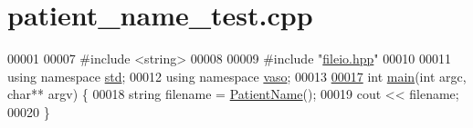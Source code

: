 \hypertarget{patient__name__test_8cpp_source}{\section{patient\+\_\+name\+\_\+test.\+cpp}
\label{patient__name__test_8cpp_source}
}

\begin{DoxyCode}
00001 
00007 \textcolor{preprocessor}{#include <string>}
00008 
00009 \textcolor{preprocessor}{#include "\hyperlink{fileio_8hpp}{fileio.hpp}"}
00010 
00011 \textcolor{keyword}{using namespace }\hyperlink{namespacestd}{std};
00012 \textcolor{keyword}{using namespace }\hyperlink{namespacevaso}{vaso};
00013 
\hypertarget{patient__name__test_8cpp_source_l00017}{}\hyperlink{patient__name__test_8cpp_a3c04138a5bfe5d72780bb7e82a18e627}{00017} \textcolor{keywordtype}{int} \hyperlink{patient__name__test_8cpp_a3c04138a5bfe5d72780bb7e82a18e627}{main}(\textcolor{keywordtype}{int} argc, \textcolor{keywordtype}{char}** argv) \{
00018     \textcolor{keywordtype}{string} filename = \hyperlink{namespacevaso_a21e264fa912f7ca3f50e7e412ba1582e}{PatientName}();
00019     cout << filename;
00020 \}
\end{DoxyCode}
